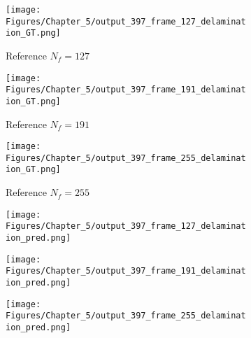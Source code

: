 \begin{figure} [!ht]
	\centering
	\begin{subfigure}[b]{.32\textwidth}
		\centering
		\texttt{[image: Figures/Chapter\_5/output\_397\_frame\_127\_delamination\_GT.png]}
		\caption{Reference $N_f=127$}
		\label{fig:ref_397_damage_127}
	\end{subfigure}
	\hfill
	\begin{subfigure}[b]{.32\textwidth}
		\centering
		\texttt{[image: Figures/Chapter\_5/output\_397\_frame\_191\_delamination\_GT.png]}
		\caption{Reference $N_f=191$}
		\label{fig:ref_397_damage_191}
	\end{subfigure}
	\hfill
	\begin{subfigure}[b]{.32\textwidth}
		\centering
		\texttt{[image: Figures/Chapter\_5/output\_397\_frame\_255\_delamination\_GT.png]}
		\caption{Reference $N_f=255$}
		\label{fig:ref_397_damage_255}	
	\end{subfigure}
	\hfill
	\begin{subfigure}[b]{.32\textwidth}
		\centering
		\texttt{[image: Figures/Chapter\_5/output\_397\_frame\_127\_delamination\_pred.png]}
		\caption{}
		\label{fig:pred_397_damage_127}
	\end{subfigure}
	\hfill
	\begin{subfigure}[b]{.32\textwidth}
		\centering
		\texttt{[image: Figures/Chapter\_5/output\_397\_frame\_191\_delamination\_pred.png]}
		\caption{}
		\label{fig:pred_397_damage_191}
	\end{subfigure}
	\hfill
	\begin{subfigure}[b]{.32\textwidth}
		\centering
		\texttt{[image: Figures/Chapter\_5/output\_397\_frame\_255\_delamination\_pred.png]}
		\caption{}
		\label{fig:pred_397_damage_255}	
	\end{subfigure}
	\caption{}
	\label{fig:num_results_CS_damage_area_397}
\end{figure}

